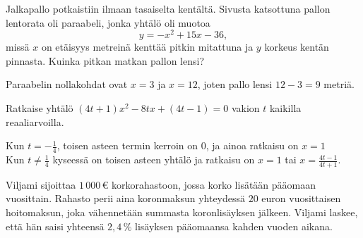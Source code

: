 \begin{tehtavasivu}
\begin{tehtava}
	Jalkapallo potkaistiin ilmaan tasaiselta kentältä. Sivusta katsottuna pallon lentorata oli paraabeli, jonka yhtälö oli muotoa
	$$y=-x^2+15x-36,$$
	missä $x$ on etäisyys metreinä kenttää pitkin mitattuna ja $y$ korkeus kentän pinnasta. Kuinka pitkan matkan pallon lensi?
	\begin{vastaus}
		Paraabelin nollakohdat ovat $x=3$ ja $x=12$, joten pallo lensi $12-3 = 9$ metriä. 
	\end{vastaus}
\end{tehtava}

\begin{tehtava}
Ratkaise yhtälö $(4t+1)x^2-8tx+(4t-1)=0$ vakion $t$ kaikilla reaaliarvoilla.
	\begin{vastaus}
		Kun $t=-\frac{1}{4}$, toisen asteen termin kerroin on $0$, ja ainoa ratkaisu on $x = 1$  \\
		Kun $t \neq \frac{1}{4}$ kyseessä on toisen asteen yhtälö ja ratkaisu on $x= 1$ tai $x=\frac{4t-1}{4t+1}$.
    \end{vastaus}
\end{tehtava}

\begin{tehtava}
	Viljami sijoittaa $1\,000$\,€ korkorahastoon, jossa korko lisätään pääomaan vuosittain. Rahasto perii aina koronmaksun yhteydessä $20$ euron vuosittaisen hoitomaksun, joka vähennetään summasta koronlisäyksen jälkeen. Viljami laskee, että hän saisi yhteensä $2,4\,\%$ lisäyksen pääomaansa kahden vuoden aikana.
	\begin{vastaus}
	\end{vastaus}
\end{tehtava}


\end{tehtavasivu}

